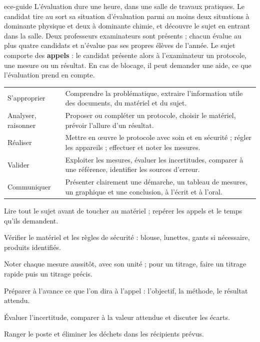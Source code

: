 \begin{blocEdition}{ece-guide}
\fontsize{10}{13.5}\selectfont
{}
L'évaluation dure une heure, dans une salle de travaux pratiques. Le candidat tire au sort sa situation d'évaluation parmi
au moins deux situations à dominante physique et deux à dominante chimie, et découvre le sujet en entrant dans la salle.
Deux professeurs examinateurs sont présents ; chacun évalue au plus quatre candidats et n'évalue pas ses propres élèves de
l'année. Le sujet comporte des \textbf{appels} : le candidat présente alors à l'examinateur un protocole, une mesure ou un
résultat. En cas de blocage, il peut demander une aide, ce que l'évaluation prend en compte.
\begin{tabularx}{\linewidth}{@{}p{38mm}Y@{}}\toprule
S'approprier & Comprendre la problématique, extraire l'information utile des documents, du matériel et du sujet. \\[1mm]
Analyser, raisonner & Proposer ou compléter un protocole, choisir le matériel, prévoir l'allure d'un résultat. \\[1mm]
Réaliser & Mettre en œuvre le protocole avec soin et en sécurité ; régler les appareils ; effectuer et noter les mesures. \\[1mm]
Valider & Exploiter les mesures, évaluer les incertitudes, comparer à une référence, identifier les sources d'erreur. \\[1mm]
Communiquer & Présenter clairement une démarche, un tableau de mesures, un graphique et une conclusion, à l'écrit et à
l'oral. \\\bottomrule
\end{tabularx}
\begin{questions}
\item Lire tout le sujet avant de toucher au matériel ; repérer les appels et le temps qu'ils demandent.
\item Vérifier le matériel et les règles de sécurité : blouse, lunettes, gants si nécessaire, produits identifiés.
\item Noter chaque mesure aussitôt, avec son unité ; pour un titrage, faire un titrage rapide puis un titrage précis.
\item Préparer à l'avance ce que l'on dira à l'appel : l'objectif, la méthode, le résultat attendu.
\item Évaluer l'incertitude, comparer à la valeur attendue et discuter les écarts.
\item Ranger le poste et éliminer les déchets dans les récipients prévus.
\end{questions}
\end{blocEdition}

